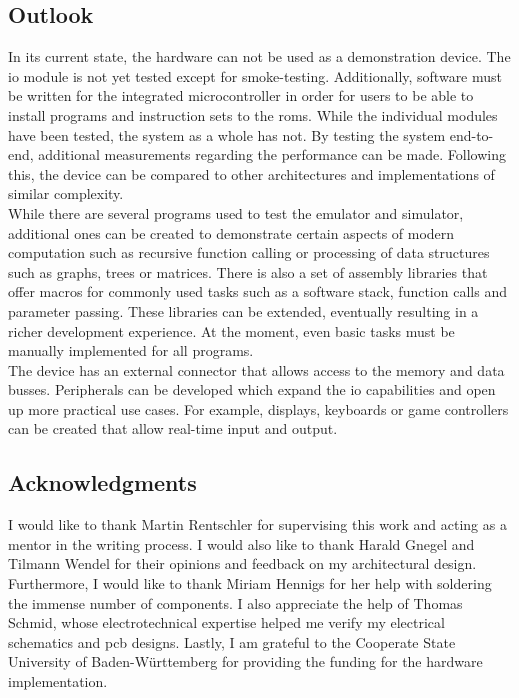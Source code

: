 \subsection{Outlook}

In its current state, the hardware can not be used as a demonstration device. The \ac{io} module is not yet tested except for smoke-testing. Additionally, software must be written for the integrated microcontroller in order for users to be able to install programs and instruction sets to the \acp{rom}. While the individual modules have been tested, the system as a whole has not. By testing the system end-to-end, additional measurements regarding the performance can be made. Following this, the device can be compared to other architectures and implementations of similar complexity.
\\

While there are several programs used to test the emulator and simulator, additional ones can be created to demonstrate certain aspects of modern computation such as recursive function calling or processing of data structures such as graphs, trees or matrices. There is also a set of assembly libraries that offer macros for commonly used tasks such as a software stack, function calls and parameter passing. These libraries can be extended, eventually resulting in a richer development experience. At the moment, even basic tasks must be manually implemented for all programs.
\\

The device has an external connector that allows access to the memory and data busses. Peripherals can be developed which expand the \ac{io} capabilities and open up more practical use cases. For example, displays, keyboards or game controllers can be created that allow real-time input and output.

\subsection{Acknowledgments}

I would like to thank Martin Rentschler for supervising this work and acting as a mentor in the writing process. I would also like to thank Harald Gnegel and Tilmann Wendel for their opinions and feedback on my architectural design. Furthermore, I would like to thank Miriam Hennigs for her help with soldering the immense number of components. I also appreciate the help of Thomas Schmid, whose electrotechnical expertise helped me verify my electrical schematics and \ac{pcb} designs. Lastly, I am grateful to the Cooperate State University of Baden-Württemberg for providing the funding for the hardware implementation.